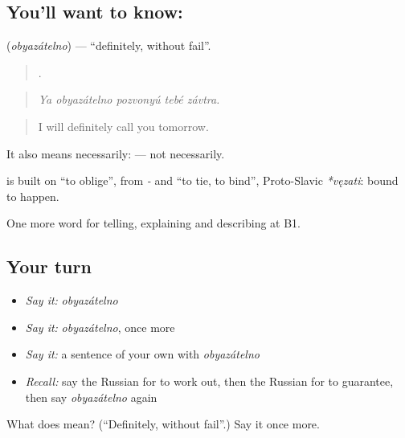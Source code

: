 \subsection*{You'll want to know: }
\textbf{} (\emph{obyazátelno}) — \textquotedblleft{}definitely, without fail\textquotedblright{}.

\begin{quote}
    .
\end{quote}

\begin{quote}
\emph{Ya obyazátelno pozvonyú tebé závtra.}
\end{quote}

\begin{quote}
I will definitely call you tomorrow.
\end{quote}

It also means necessarily: \emph{ } — not necessarily.

\begin{cousinweb}
\textbf{} is built on \emph{} \textquotedblleft{}to oblige\textquotedblright{}, from \emph{-} and \emph{} \textquotedblleft{}to tie, to bind\textquotedblright{}, Proto-Slavic \emph{*vęzati}: bound to happen.
\end{cousinweb}

\begin{grammarlens}[title={What you've built}]
One more word for telling, explaining and describing at B1.
\end{grammarlens}

\subsection*{Your turn}
\begin{itemize}
\raggedright
  \item \emph{Say it:} \emph{obyazátelno}
  \item \emph{Say it:} \emph{obyazátelno}, once more
  \item \emph{Say it:} a sentence of your own with \emph{obyazátelno}
  \item \emph{Recall:} say the Russian for to work out, then the Russian for to guarantee, then say \emph{obyazátelno} again
\end{itemize}

\begin{tcolorbox}[breakable,colback=teal!4,colframe=teal!35!black,title={Before you move on}]
What does  mean? (\textquotedblleft{}Definitely, without fail\textquotedblright{}.) Say it once more.
\end{tcolorbox}
